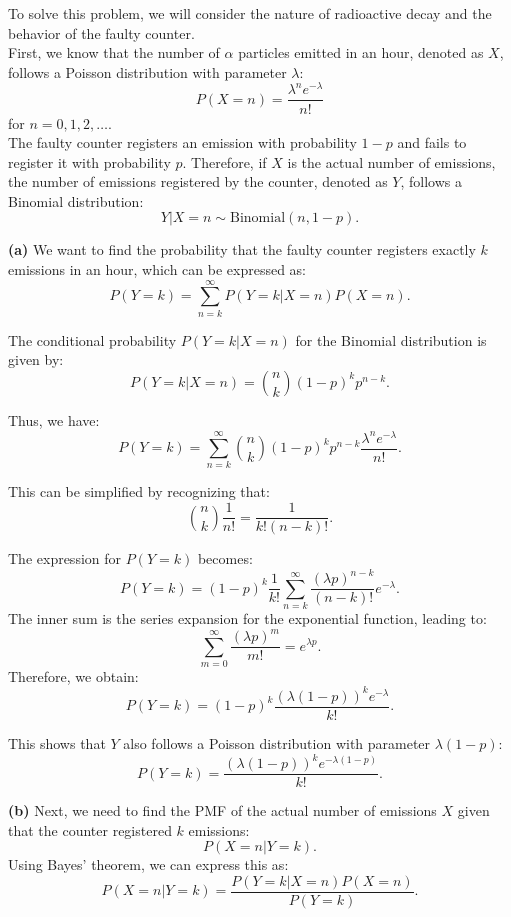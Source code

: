     \begin{solution}
    To solve this problem, we will consider the nature of radioactive decay and the behavior of the faulty counter.\\
    
    First, we know that the number of \(\alpha\) particles emitted in an hour, denoted as \(X\), follows a Poisson distribution with parameter \(\lambda\):
    \[
    P(X = n) = \frac{\lambda^n e^{-\lambda}}{n!}
    \]
    for \(n = 0, 1, 2, \ldots\).\\
    
    The faulty counter registers an emission with probability \(1 - p\) and fails to register it with probability \(p\). Therefore, if \(X\) is the actual number of emissions, the number of emissions registered by the counter, denoted as \(Y\), follows a Binomial distribution:
    \[
    Y | X = n \sim \text{Binomial}(n, 1 - p).
    \]
    
    \textbf{(a)} We want to find the probability that the faulty counter registers exactly \(k\) emissions in an hour, which can be expressed as:
    \[
    P(Y = k) = \sum_{n=k}^{\infty} P(Y = k | X = n) P(X = n).
    \]
    
    The conditional probability \(P(Y = k | X = n)\) for the Binomial distribution is given by:
    \[
    P(Y = k | X = n) = \binom{n}{k} (1 - p)^k p^{n - k}.
    \]
    
    Thus, we have:
    \[
    P(Y = k) = \sum_{n=k}^{\infty} \binom{n}{k} (1 - p)^k p^{n - k} \frac{\lambda^n e^{-\lambda}}{n!}.
    \]
    
    This can be simplified by recognizing that:
    \[
    \binom{n}{k} \frac{1}{n!} = \frac{1}{k!(n-k)!}.
    \]
    
    The expression for \(P(Y = k)\) becomes:
    \[
    P(Y = k) = (1 - p)^k \frac{1}{k!} \sum_{n=k}^{\infty} \frac{(\lambda p)^{n - k}}{(n - k)!} e^{-\lambda}.
    \]
    The inner sum is the series expansion for the exponential function, leading to:
    \[
    \sum_{m=0}^{\infty} \frac{(\lambda p)^m}{m!} = e^{\lambda p}.
    \]
    Therefore, we obtain:
    \[
    P(Y = k) = (1 - p)^k \frac{(\lambda (1 - p))^k e^{-\lambda}}{k!}.
    \]
    
    This shows that \(Y\) also follows a Poisson distribution with parameter \(\lambda (1 - p)\):
    \[
    P(Y = k) = \frac{(\lambda (1 - p))^k e^{-\lambda (1 - p)}}{k!}.
    \]
    
    \textbf{(b)} Next, we need to find the PMF of the actual number of emissions \(X\) given that the counter registered \(k\) emissions:
    \[
    P(X = n | Y = k).
    \]
    Using Bayes' theorem, we can express this as:
    \[
    P(X = n | Y = k) = \frac{P(Y = k | X = n) P(X = n)}{P(Y = k)}.
    \]
    

\end{solution}
